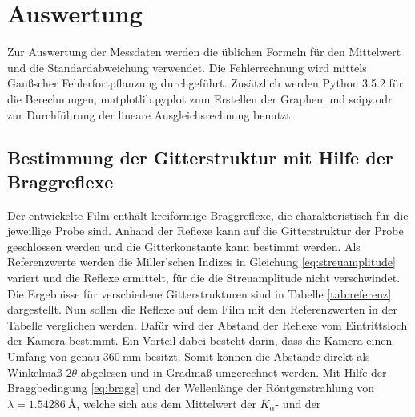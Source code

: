 \section{Auswertung}

Zur Auswertung der Messdaten werden die üblichen Formeln für den Mittelwert und die Standardabweichung verwendet. Die Fehlerrechnung wird mittels
Gaußscher Fehlerfortpflanzung durchgeführt. Zusätzlich werden Python 3.5.2 für die Berechnungen, matplotlib.pyplot zum Erstellen der Graphen und
scipy.odr zur Durchführung der lineare Ausgleichsrechnung benutzt.

\subsection{Bestimmung der Gitterstruktur mit Hilfe der Braggreflexe}



Der entwickelte Film enthält kreiförmige Braggreflexe, die charakteristisch für die jeweillige Probe sind. Anhand der Reflexe kann auf die Gitterstruktur der
Probe geschlossen werden und die Gitterkonstante kann bestimmt werden.
Als Referenzwerte werden die Miller'schen Indizes in Gleichung \eqref{eq:streuamplitude} variert und die Reflexe ermittelt, für die die Streuamplitude nicht verschwindet.
Die Ergebnisse für
verschiedene Gitterstrukturen sind in Tabelle \ref{tab:referenz} dargestellt.\newline
Nun sollen die Reflexe auf dem Film mit den Referenzwerten in der Tabelle verglichen werden. Dafür wird der Abstand der Reflexe vom Eintrittsloch der Kamera bestimmt. Ein
Vorteil dabei besteht darin, dass die Kamera einen Umfang von genau $\SI{360}{\milli\meter}$ besitzt. Somit können die Abstände direkt als Winkelmaß
$2\theta$ abgelesen und in Gradmaß umgerechnet werden. Mit Hilfe der Braggbedingung \eqref{eq:bragg} und der Wellenlänge der Röntgenstrahlung von
$\lambda = \SI{1,54286}{\angstrom}$, welche sich aus dem Mittelwert der $K_\alpha$- und der

